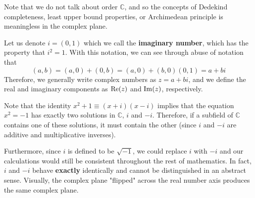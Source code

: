   Note that we do not talk about order $\mathbb{C}$, and so the concepts of Dedekind completeness, least upper bound properties, or Archimedean principle is meaningless in the complex plane. 

  \begin{definition} 
    Let us denote $i = (0, 1)$ which we call the \textbf{imaginary number}, which has the property that $i^2 = 1$. With this notation, we can see through abuse of notation that 
    \begin{equation}
      (a, b) = (a, 0) + (0, b) = (a, 0) + (b, 0) (0, 1) = a + bi
    \end{equation} 
    Therefore, we generally write complex numbers as $z = a + bi$, and we define the real and imaginary components as $\re(z)$ and $\im(z)$, respectively. 
  \end{definition}

  Note that the identity $x^2 + 1 \equiv (x + i) (x - i)$ implies that the equation $x^2 = -1$ has exactly two solutions in $\mathbb{C}$, $i$ and $-i$. Therefore, if a subfield of $\mathbb{C}$ contains one of these solutions, it must contain the other (since $i$ and $-i$ are additive and multiplicative inverses). 

  Furthermore, since $i$ is defined to be $\sqrt{-1}$, we could replace $i$ with $-i$ and our calculations would still be consistent throughout the rest of mathematics. In fact, $i$ and $-i$ behave \textbf{exactly} identically and cannot be distinguished in an abstract sense. Visually, the complex plane "flipped" across the real number axis produces the same complex plane. 


